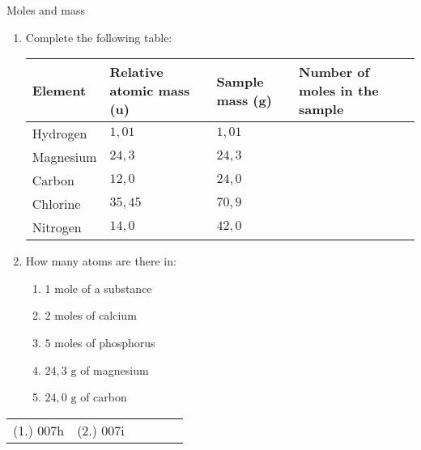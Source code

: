 	\par
{}
\label{m38717*secfhsst!!!underscore!!!id127}
            \begin{exercises}{Moles and mass
      }
            \nopagebreak \vspace{-1cm}
      \label{m38717*id276067}\begin{enumerate}[noitemsep, label=\textbf{\arabic*}. ] 

            \label{m38717*uid2}\item 
Complete the following table:
          \begin{table}[H]
        \begin{center}
      \label{m38717*id276082}
    \noindent
      \begin{tabular}{|l|l|l|l|}\hline
\textbf{Element} & \textbf{Relative atomic mass (u)} & \textbf{Sample mass (g)} & \textbf{Number of moles in the sample} \\ \hline
        Hydrogen & $1,01$ & $1,01$ & \\ \hline
        Magnesium & $24,3$ & $24,3$ & \\ \hline
        Carbon & $12,0$ & $24,0$ & \\ \hline
        Chlorine & $35,45$ & $70,9$ & \\ \hline
        Nitrogen & $14,0$ & $42,0$ & \\ \hline
    \end{tabular}
      \end{center}
\end{table}
    \par
         \label{m38717*uid3}\item 
How many atoms are there in:
\begin{multicols}{2}
\label{m38717*id276311}\begin{enumerate}[noitemsep, label=\textbf{\alph*}. ] 
            \label{m38717*uid4}\item 1 mole of a substance
\label{m38717*uid5}\item $2$ moles of calcium
\label{m38717*uid6}\item $5$ moles of phosphorus
\label{m38717*uid7}\item $24,3 \text{ g}$ of magnesium
\label{m38717*uid8}\item $24,0 \text{ g}$ of carbon
\end{enumerate}
\end{multicols}
                \end{enumerate}
\practiceinfo
\par 
 \par \begin{tabular}[h]{cccccc}
 (1.) 007h  &  (2.) 007i  & \end{tabular}
\end{exercises}
